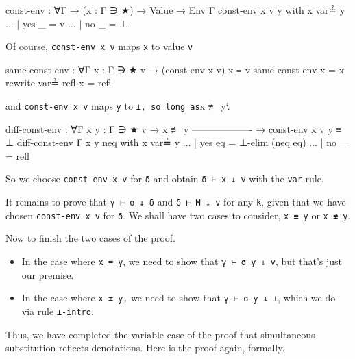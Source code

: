\begin{fence}
\begin{code}
const-env : ∀{Γ} → (x : Γ ∋ ★) → Value → Env Γ
const-env x v y with x var≟ y
...             | yes _       = v
...             | no _        = ⊥
\end{code}
\end{fence}

Of course, \texttt{const-env\ x\ v} maps \texttt{x} to value \texttt{v}

\begin{fence}
\begin{code}
same-const-env : ∀{Γ} {x : Γ ∋ ★} {v} → (const-env x v) x ≡ v
same-const-env {x = x} rewrite var≟-refl x = refl
\end{code}
\end{fence}

and \texttt{const-env\ x\ v} maps \texttt{y} to
\texttt{⊥,\ so\ long\ as}x ≢ y`.

\begin{fence}
\begin{code}
diff-const-env : ∀{Γ} {x y : Γ ∋ ★} {v}
  → x ≢ y
    -------------------
  → const-env x v y ≡ ⊥
diff-const-env {Γ} {x} {y} neq with x var≟ y
...  | yes eq  =  ⊥-elim (neq eq)
...  | no _    =  refl
\end{code}
\end{fence}

So we choose \texttt{const-env\ x\ v} for \texttt{δ} and obtain
\texttt{δ\ ⊢\ x\ ↓\ v} with the \texttt{var} rule.

It remains to prove that \texttt{γ\ ⊢\ σ\ ↓\ δ} and
\texttt{δ\ ⊢\ M\ ↓\ v} for any \texttt{k}, given that we have chosen
\texttt{const-env\ x\ v} for \texttt{δ}. We shall have two cases to
consider, \texttt{x\ ≡\ y} or \texttt{x\ ≢\ y}.

Now to finish the two cases of the proof.

\begin{itemize}
\tightlist
\item
  In the case where \texttt{x\ ≡\ y}, we need to show that
  \texttt{γ\ ⊢\ σ\ y\ ↓\ v}, but that's just our premise.
\item
  In the case where \texttt{x\ ≢\ y,} we need to show that
  \texttt{γ\ ⊢\ σ\ y\ ↓\ ⊥}, which we do via rule \texttt{⊥-intro}.
\end{itemize}

Thus, we have completed the variable case of the proof that simultaneous
substitution reflects denotations. Here is the proof again, formally.

